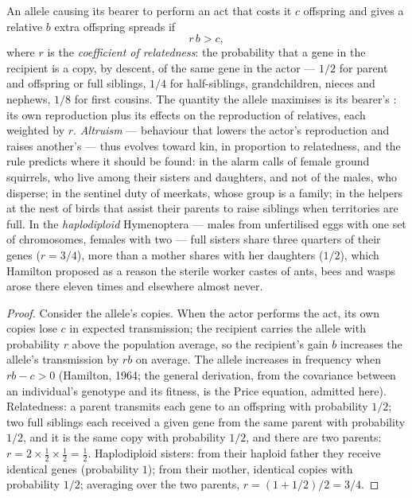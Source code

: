 \begin{theorem}\label{thm:b3:behavioural-ecology:hamilton}
An allele causing its bearer to perform an act that costs it $c$
offspring and gives a relative $b$ extra offspring spreads if
\[
r\,b > c ,
\]
where $r$ is the \emph{coefficient of relatedness}: the probability
that a gene in the recipient is a copy, by descent, of the same gene in
the actor --- $1/2$ for parent and offspring or full siblings, $1/4$
for half-siblings, grandchildren, nieces and nephews, $1/8$ for first
cousins. The quantity the allele maximises is its bearer's
\emph{}: its own reproduction plus its effects on the
reproduction of relatives, each weighted by $r$. \emph{Altruism} ---
behaviour that lowers the actor's reproduction and raises another's
--- thus evolves toward kin, in proportion to relatedness, and the
rule predicts where it should be found: in the alarm calls of female
ground squirrels, who live among their sisters and daughters, and not
of the males, who disperse; in the sentinel duty of meerkats, whose
group is a family; in the helpers at the nest of birds that assist
their parents to raise siblings when territories are full. In the
\emph{haplodiploid} Hymenoptera --- males from unfertilised eggs with one
set of chromosomes, females with two --- full sisters share three
quarters of their genes ($r = 3/4$), more than a mother shares with her
daughters ($1/2$), which Hamilton proposed as a reason the sterile
worker castes of ants, bees and wasps arose there eleven times and
elsewhere almost never.
\end{theorem}
\begin{proof}
Consider the allele's copies. When the actor performs the act, its own
copies lose $c$ in expected transmission; the recipient carries the
allele with probability $r$ above the population average, so the
recipient's gain $b$ increases the allele's transmission by $rb$ on
average. The allele increases in frequency when $rb - c > 0$ (Hamilton,
1964; the general derivation, from the covariance between an
individual's genotype and its fitness, is the Price equation, admitted
here). Relatedness: a parent transmits each gene to an offspring with
probability $1/2$; two full siblings each received a given gene from
the same parent with probability $1/2$, and it is the same copy with
probability $1/2$, and there are two parents: $r = 2\times\tfrac{1}{2}
\times\tfrac{1}{2} = \tfrac{1}{2}$. Haplodiploid sisters: from their
haploid father they receive identical genes (probability $1$); from
their mother, identical copies with probability $1/2$; averaging over
the two parents, $r = (1 + 1/2)/2 = 3/4$.
\end{proof}

